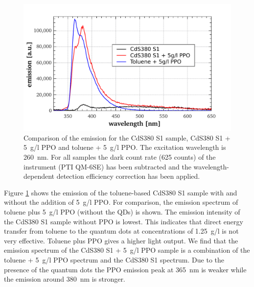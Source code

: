 \documentclass[cits]{JINST}
\begin{document}
\begin{figure}
      \begin{center}
        \includegraphics[scale=0.44]{graphs/G_QD380_ex260_corr.pdf}
        \caption[]{Comparison of the emission for the CdS380 S1 sample, CdS380 S1 + 5~g/l PPO and toluene + 5~g/l PPO. The excitation wavelength is 260~nm. For all samples the dark count rate (625 counts) of the instrument (PTI QM-6SE) has been subtracted and the wavelength-dependent detection efficiency correction has been applied. \label{G_QD380_ex260_corr}}
        \end{center}
\end{figure}

Figure \ref{G_QD380_ex260_corr} shows the emission of the toluene-based CdS380 S1 sample with and without the addition of 5~g/l PPO. For comparison, the emission spectrum of toluene plus 5~g/l PPO (without the QDs) is shown. The emission intensity of the CdS380 S1 sample without PPO is lowest. This indicates that direct energy transfer from toluene to the quantum dots at concentrations of 1.25~g/l is not very effective. Toluene plus PPO gives a higher light output. We find that the emission spectrum of the CdS380 S1 + 5~g/l PPO sample is a combination of the toluene + 5~g/l PPO spectrum and the CdS380 S1 spectrum. Due to the presence of the quantum dots the PPO emission peak at 365~nm is weaker while the emission around 380~nm is stronger.  
\end{document}
